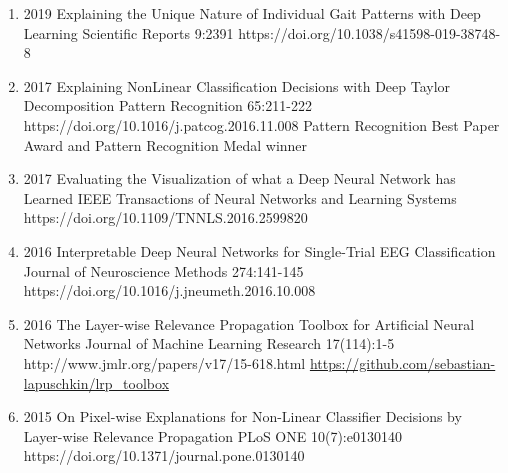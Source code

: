 \documentclass[10pt,a4paper]{article} %
\begin{document}
{\begin{enumerate}
    \item[] 
                        {2019}
                        {Explaining the Unique Nature of Individual Gait Patterns with Deep Learning}
                        {Scientific Reports}
                        {9:2391}
                        {https://doi.org/10.1038/s41598-019-38748-8}

    \item[] 
                            {2017}
                            {Explaining NonLinear Classification Decisions with Deep Taylor Decomposition}
                            {Pattern Recognition}
                            {65:211-222}
                            {https://doi.org/10.1016/j.patcog.2016.11.008}
                            {Pattern Recognition Best Paper Award and Pattern Recognition Medal winner}

    \item[] 
                        {2017}
                        {Evaluating the Visualization of what a Deep Neural Network has Learned}
                        {IEEE Transactions of Neural Networks and Learning Systems}
                        {}
                        {https://doi.org/10.1109/TNNLS.2016.2599820}

    \item[] 
                        {2016}
                        {Interpretable Deep Neural Networks for Single-Trial EEG Classification}
                        {Journal of Neuroscience Methods}
                        {274:141-145}
                        {https://doi.org/10.1016/j.jneumeth.2016.10.008}

    \item[] 
                        {2016}
                        {The Layer-wise Relevance Propagation Toolbox for Artificial Neural Networks}
                        {Journal of Machine Learning Research}
                        {17(114):1-5}
                        {http://www.jmlr.org/papers/v17/15-618.html}
                        {\href{https://github.com/sebastian-lapuschkin/lrp_toolbox}{https://github.com/sebastian-lapuschkin/lrp\_toolbox}}

    \item[] 
                        {2015}
                        {On Pixel-wise Explanations for Non-Linear Classifier Decisions by Layer-wise Relevance Propagation}
                        {PLoS ONE}
                        {10(7):e0130140}
                        {https://doi.org/10.1371/journal.pone.0130140}
\end{enumerate}
}
\end{document}
